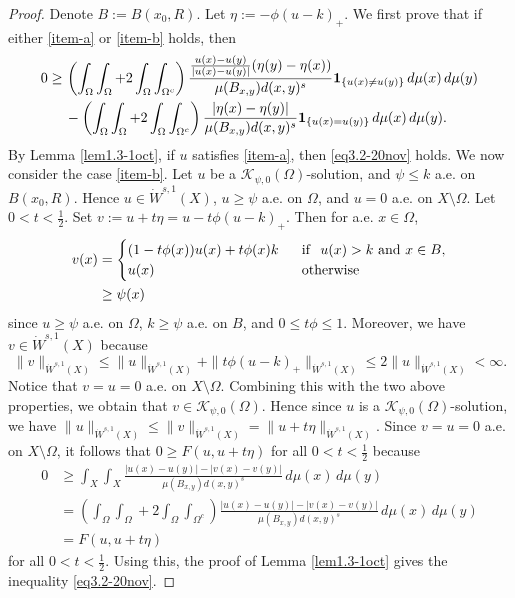 \documentclass[11pt,leqno]{amsart}
\numberwithin{equation}{section}
\theoremstyle{definition}
\begin{document}
	\begin{proof}
		Denote $B:=B(x_0,R)$. 
		Let $\eta:=-\phi (u-k)_+$.  We first prove that if  either  \ref{item-a} or \ref{item-b} holds, then 
		{
			\begin{align}\notag
				0\geq&\, \left( \int_\Omega\int_\Omega +2\int_\Omega\int_{\Omega^c} \right) \frac{\frac{u(x)-u(y)}{|u(x)-u(y)|} (\eta(y)-\eta(x)) }{\mu(B_{x,y}) d(x,y)^s} {\bf 1}_{\{u(x)\neq u(y) \}} \,d\mu(x)\,d\mu(y)\\
				&\, - \left( \int_\Omega\int_\Omega +2\int_\Omega\int_{\Omega^c} \right) \frac{ |\eta(x)-\eta(y)| }{\mu(B_{x,y}) d(x,y)^s} {\bf 1}_{\{u(x)=u(y)\}}\,d\mu(x)\,d\mu(y) \label{eq3.2-20nov}.
			\end{align}
		}
		By Lemma \ref{lem1.3-1oct}, if $u$ satisfies \ref{item-a}, then  \eqref{eq3.2-20nov}  holds.
		We now consider the case \ref{item-b}. Let $u$ be a $\mathcal{K}_{\psi,0}(\Omega)$-solution,
		and $\psi\leq k$ a.e. on $B(x_0,R)$. Hence $u\in \dot W^{s,1}(X)$,
		$u\geq \psi$ a.e. on $\Omega$, and $u=0$ a.e. on $X\setminus\Omega$.
		Let $0<t<\frac{1}{2}$. Set $v:=u+t\eta=u-t\phi(u-k)_+$. Then for a.e. $x\in\Omega$,
		\begin{align*}
			v(x)& =  \begin{cases}
				(1-t\phi(x))u(x)+t\phi(x) k& {\rm \ \ if\ \ }u(x)>k {\rm \ and\ }x\in B,\\
				u(x)& {\rm \ \ otherwise\ \ }
			\end{cases}\\
			&\geq   \psi(x)
		\end{align*}
		since $u\geq \psi$ a.e. on $\Omega$, $k\geq \psi$ a.e. on $B$, and $0\leq t\phi\leq 1$.
		Moreover, we have $v\in \dot W^{s,1}(X)$ because 
		\[
		\|v\|_{\dot W^{s,1}(X)}
		\leq 
		{ \|u\|_{\dot W^{s,1}(X)} }
		+\|t\phi(u-k)_+\|_{\dot W^{s,1}(X)}
		\leq 2 \|u\|_{\dot W^{s,1}(X)}<\infty.
		\]
		Notice that   $v=u=0$ a.e. on $X\setminus\Omega$. 
		Combining this with the two above properties, we obtain that
		$v\in \mathcal K_{\psi,0}(\Omega)$. Hence since $u$ is a $\mathcal{K}_{\psi,0}(\Omega)$-solution,
		we have $\|u\|_{\dot W^{s,1}(X)}\leq \|v\|_{\dot W^{s,1}(X)}=\|u+t\eta\|_{\dot W^{s,1}(X)}$.
		Since $v=u=0$ a.e. on $X\setminus\Omega$, it follows that 
		{ $0\geq F(u,u+t\eta)$ for  all $0<t<\frac{1}{2}$ because 
			\begin{align*}
				0
				&\geq  \int_X\int_X \frac{|u(x)-u(y)|-|v(x)-v(y)|}{\mu(B_{x,y})d(x,y)^s}\,d\mu(x)\,d\mu(y)\\
				&=\left(\int_{\Omega}\int_{\Omega}+2\int_{\Omega}\int_{\Omega^c} \right)\frac{|u(x)-u(y)|-|v(x)-v(y)|}{\mu(B_{x,y})d(x,y)^s}\,d\mu(x)\,d\mu(y)\\
				& = F(u,u+t\eta)
			\end{align*}
			for all $0<t<\frac{1}{2}$. 
		}
		Using this, the proof of Lemma \ref{lem1.3-1oct} gives the inequality \eqref{eq3.2-20nov}.
		

\end{proof}
\end{document}
